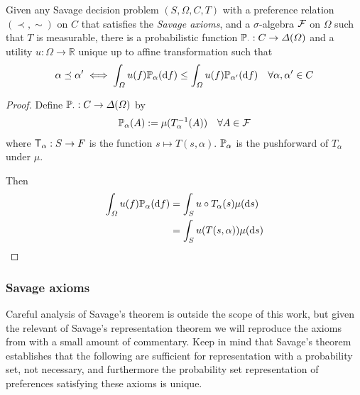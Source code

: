 \begin{theorem}
Given any Savage decision problem $(S,\Omega,C,T)$ with a preference relation $(\prec,\sim)$ on $C$ that satisfies the \emph{Savage axioms}, and a $\sigma$-algebra $\mathcal{F}$ on $\Omega$ such that $T$ is measurable, there is a probabilistic function $\mathbb{P}_{\cdot}:C\to \Delta(\Omega)$ and a utility $u:\Omega\to \mathbb{R}$ unique up to affine transformation such that
\begin{align}
    \alpha\preceq \alpha' &\iff \int_\Omega u(f)\mathbb{P}_\alpha(\mathrm{d}f) \leq \int_\Omega u(f)\mathbb{P}_{\alpha'}(\mathrm{d}f)&\forall \alpha,\alpha'\in C
\end{align}
\end{theorem}

\begin{proof}
Define $\mathbb{P}_\cdot:C\to \Delta(\Omega)$ by
\begin{align}
    \mathbb{P}_\alpha(A) &:= \mu (T_\alpha^{-1}(A))&\forall A\in \mathcal{F}
\end{align}
where $\mathsf{T}_\alpha:S\to F$ is the function $s\mapsto T(s,\alpha)$. $\mathbb{P}_\alpha$ is the pushforward of $T_\alpha$ under $\mu$.

Then 
\begin{align}
    \int_\Omega u(f)\mathbb{P}_\alpha(\mathrm{d}f) &= \int_S u \circ T_\alpha (s)\mu(\mathrm{d}s)\\
    &= \int_S u(T(s,\alpha))\mu(\mathrm{d}s)
\end{align}
\end{proof}

\subsubsection{Savage axioms}\label{sec:savage_axioms}

Careful analysis of Savage's theorem is outside the scope of this work, but given the relevant of Savage's representation theorem we will reproduce the axioms from \citet{savage_foundations_1954} with a small amount of commentary. Keep in mind that Savage's theorem establishes that the following are sufficient for representation with a probability set, not necessary, and furthermore the probability set representation of preferences satisfying these axioms is unique.

